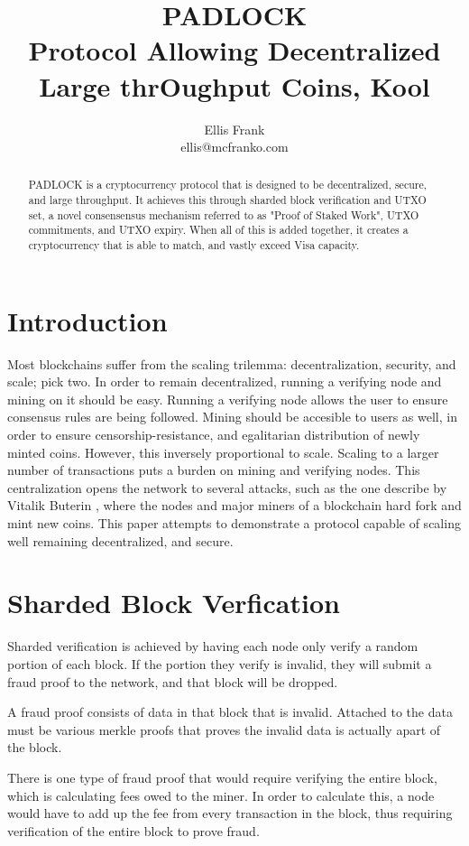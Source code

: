 \documentclass[12pt, letterpaper]{article}
\title{
    PADLOCK \\
    \large Protocol Allowing Decentralized Large thrOughput Coins, Kool
}
\author{Ellis Frank \\ ellis@mcfranko.com}
\begin{document}
\maketitle

\begin{abstract}
    PADLOCK is a cryptocurrency protocol that is designed to be decentralized,
    secure, and large throughput. It achieves this through sharded block
    verification and UTXO set, a novel consensensus mechanism referred to as
    "Proof of Staked Work", UTXO commitments, and UTXO expiry.  When all of this
    is added together, it creates a cryptocurrency that is able to match, and
    vastly exceed Visa capacity.
\end{abstract}

\section{Introduction}
Most blockchains suffer from the scaling trilemma: decentralization, security,
and scale; pick two. In order to remain decentralized, running a verifying node
and mining on it should be easy. Running a verifying node allows the user to
ensure consensus rules are being followed. Mining should be accesible to users
as well, in order to ensure censorship-resistance, and egalitarian distribution
of newly minted coins. However, this inversely proportional to scale. Scaling to
a larger number of transactions puts a burden on mining and verifying nodes.
This centralization opens the network to several attacks, such as the one
describe by Vitalik Buterin \cite{LimitToBlockchainScaling}, where the nodes and
major miners of a blockchain hard fork and mint new coins.  This paper attempts
to demonstrate a protocol capable of scaling well remaining decentralized, and
secure.

\section{Sharded Block Verfication}
Sharded verification is achieved by having each node only verify a random
portion of each block. If the portion they verify is invalid, they will submit a
fraud proof to the network, and that block will be dropped.

A fraud proof consists of data in that block that is invalid. Attached to the
data must be various merkle proofs that proves the invalid data is actually
apart of the block.

There is one type of fraud proof that would require verifying the entire block,
which is calculating fees owed to the miner. In order to calculate this, a node
would have to add up the fee from every transaction in the block, thus requiring
verification of the entire block to prove fraud.
\end{document}
